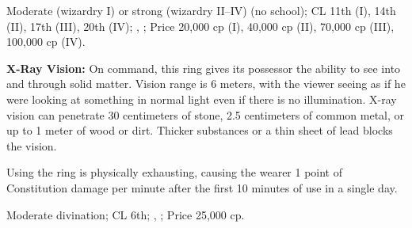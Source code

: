 Moderate (wizardry I) or strong (wizardry II--IV) (no school); CL 11th (I), 14th (II), 17th (III), 20th (IV); , ; Price 20,000 cp (I), 40,000 cp (II), 70,000 cp (III), 100,000 cp (IV).


\textbf{X-Ray Vision:} On command, this ring gives its possessor the ability to see into and through solid matter. Vision range is 6 meters, with the viewer seeing as if he were looking at something in normal light even if there is no illumination. X-ray vision can penetrate 30 centimeters of stone, 2.5 centimeters of common metal, or up to 1 meter of wood or dirt. Thicker substances or a thin sheet of lead blocks the vision.

Using the ring is physically exhausting, causing the wearer 1 point of Constitution damage per minute after the first 10 minutes of use in a single day.

Moderate divination; CL 6th; , ; Price 25,000 cp.

